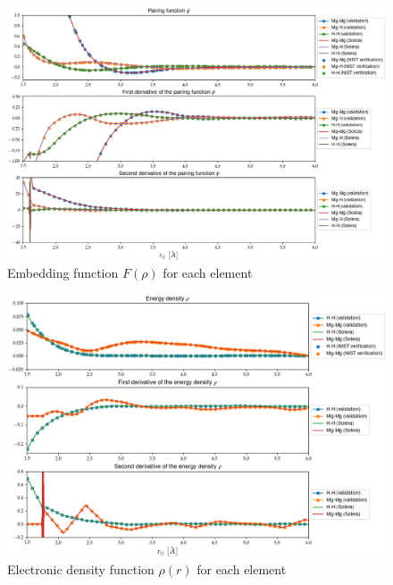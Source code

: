 \documentclass{article}
\begin{document}
\begin{figure}[h!]
	\centering
	\includegraphics[width=\textwidth]{Figures/Fig-Embeding-Energy.png}
\caption{Embedding function $F(\rho)$ for each element}
\end{figure}
\begin{figure}[h!]
	\centering
	\includegraphics[width=\textwidth]{Figures/Fig-Energy-Density.png}
	\caption{Electronic density function $\rho(r)$ for each element}
\end{figure}
\end{document}
